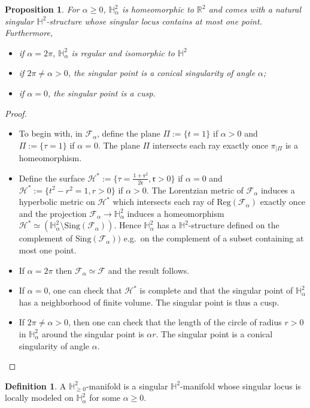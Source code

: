 \documentclass[a4paper,12pt]{article}
\def\r{\mathfrak{r}}
\def\H{\mathbb{H}}
\def\sing{\mathrm{Sing}}
\def\RR{\mathbb{R}}
\def\Reg{\mathrm{Reg}}
\def\reg{\Reg}
\def\Future{\mathcal F}
\def\sing{\mathrm{Sing}}
\def\reg{\mathrm{Reg}}
\def\Reg{\mathrm{Reg}}
\def\r{\mathfrak{r}}
\def\sing{\mathrm{Sing}}
\newtheorem{prop}[lem]{Proposition}
\theoremstyle{definition}
\newtheorem{defi}[lem]{Definition}	%
\begin{document}
\begin{prop}\label{prop:homeomorphic_comes_natural_singular} For $\alpha \geq 0$, $\H^2_\alpha$ is homeomorphic to $\RR^2$ and comes with a natural singular $\H^2$-structure whose singular locus contains at most one point. 
		Furthermore,
		\begin{itemize}
		 \item if $\alpha=2\pi$, $\H^2_\alpha$ is regular and isomorphic to $\H^2$
		 \item if $2\pi\neq\alpha>0$, the singular point is a conical singularity of angle $\alpha$;
		 \item if $\alpha=0$, the singular point is a cusp.
		\end{itemize}
		\end{prop}
		\begin{proof}
			\begin{itemize}
			 \item To begin with, in $\Future_\alpha$, define the plane $\Pi:= \{t=1\}$ if $\alpha>0$ and $\Pi:=\{\tau=1\}$ if $\alpha=0$. The plane $\Pi$ intersects each ray exactly once $\pi_{|\Pi}$ is a homeomorphism.
			 
			 \item Define the surface $\mathcal{H}^*:= \{\tau=\frac{1+\r^2}{2\r},\r>0\}$ if $\alpha=0$ and $\mathcal{H}^*:= \{t^2-r^2=1, r>0\}$ if $\alpha >0 $. The Lorentzian metric of $\Future_\alpha$ induces a hyperbolic metric on $\mathcal{H}^*$ which intersects each ray of $\reg(\Future_\alpha)$ exactly once and the projection $\Future_\alpha\rightarrow \H^2_\alpha$ induces a homeomorphism $\mathcal{H}^* \simeq (\H^2_\alpha\setminus \sing(\Future_\alpha))$. Hence $\H^2_\alpha$ has a $\H^2$-structure defined on the complement of $\sing(\Future_\alpha))$ e.g.\ on the complement of a subset containing at most one point. 
			 
			 \item If $\alpha=2\pi$ then $\Future_\alpha\simeq \Future$ and the result follows.
			 \item If $\alpha=0$, one can check that $\mathcal{H}^*$ is complete and that the singular point of $\H^2_\alpha$ has a neighborhood of finite volume. The singular point is thus a cusp.
			 \item If $2\pi\neq \alpha>0$, then one can check that the length of the circle of radius $r>0$ in $\H^2_\alpha$ around the singular point is $\alpha r$. The singular point is a conical singularity of angle $\alpha$.
			\end{itemize}\end{proof}
		\begin{defi} \label{defi:Hgeq0} A $\H^2_{\geq 0}$-manifold is a singular $\H^2$-manifold whose singular locus is locally modeled on $\H^2_{\alpha}$  
		 for some $\alpha\geq 0$.
		\end{defi}
\end{document}

